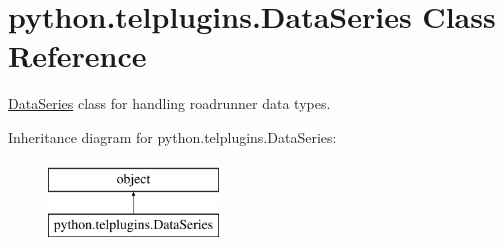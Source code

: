 \hypertarget{classpython_1_1telplugins_1_1_data_series}{\section{python.\-telplugins.\-Data\-Series Class Reference}
\label{classpython_1_1telplugins_1_1_data_series}
}


\hyperlink{classpython_1_1telplugins_1_1_data_series}{Data\-Series} class for handling roadrunner data types.  


Inheritance diagram for python.\-telplugins.\-Data\-Series\-:\begin{figure}[H]
\begin{center}
\leavevmode
\includegraphics[height=2.000000cm]{classpython_1_1telplugins_1_1_data_series}
\end{center}
\end{figure}

